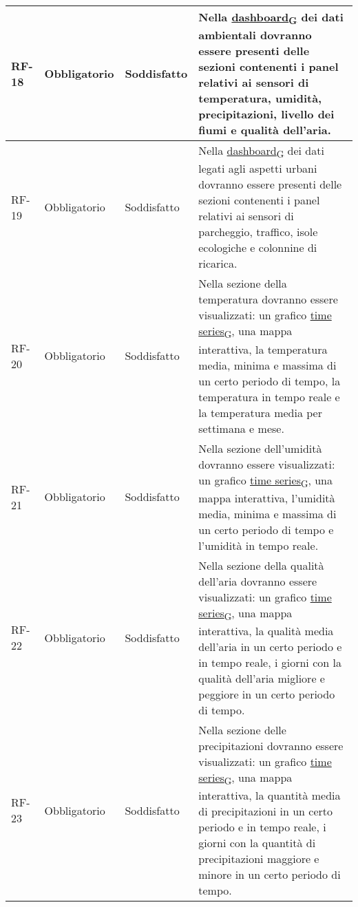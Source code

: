 \begin{longtable}{|>{\centering\arraybackslash}m{}|>{\centering\arraybackslash}m{}|>{\centering\arraybackslash}m{}|>{\centering\arraybackslash}m{}|}
	\\\hline
	RF-18           & Obbligatorio        & Soddisfatto & Nella \href{https://7last.github.io/docs/pb/documentazione-interna/glossario\#dashboard}{dashboard\textsubscript{G}} dei dati ambientali dovranno essere presenti delle sezioni contenenti i panel relativi ai sensori di temperatura, umidità, precipitazioni, livello dei fiumi e qualità dell'aria.
	\\\hline
	RF-19           & Obbligatorio        & Soddisfatto & Nella \href{https://7last.github.io/docs/pb/documentazione-interna/glossario\#dashboard}{dashboard\textsubscript{G}} dei dati legati agli aspetti urbani dovranno essere presenti delle sezioni contenenti i panel relativi ai sensori di parcheggio, traffico, isole ecologiche e colonnine di ricarica.
	\\\hline
	RF-20           & Obbligatorio        & Soddisfatto & Nella sezione della temperatura dovranno essere visualizzati: un grafico \href{https://7last.github.io/docs/pb/documentazione-interna/glossario\#time-series}{time series\textsubscript{G}}, una mappa interattiva, la temperatura media, minima e massima di un certo periodo di tempo, la temperatura in tempo reale e la temperatura media per settimana e mese.
	\\\hline
	RF-21           & Obbligatorio        & Soddisfatto & Nella sezione dell'umidità dovranno essere visualizzati: un grafico \href{https://7last.github.io/docs/pb/documentazione-interna/glossario\#time-series}{time series\textsubscript{G}}, una mappa interattiva, l'umidità media, minima e massima di un certo periodo di tempo e l'umidità in tempo reale.
	\\\hline
	RF-22           & Obbligatorio        & Soddisfatto & Nella sezione della qualità dell'aria dovranno essere visualizzati: un grafico \href{https://7last.github.io/docs/pb/documentazione-interna/glossario\#time-series}{time series\textsubscript{G}}, una mappa interattiva, la qualità media dell'aria in un certo periodo e in tempo reale, i giorni con la qualità dell'aria migliore e peggiore in un certo periodo di tempo.
	\\\hline
	RF-23           & Obbligatorio        & Soddisfatto & Nella sezione delle precipitazioni dovranno essere visualizzati: un grafico \href{https://7last.github.io/docs/pb/documentazione-interna/glossario\#time-series}{time series\textsubscript{G}}, una mappa interattiva, la quantità media di precipitazioni in un certo periodo e in tempo reale, i giorni con la quantità di precipitazioni maggiore e minore in un certo periodo di tempo.

\end{longtable}
